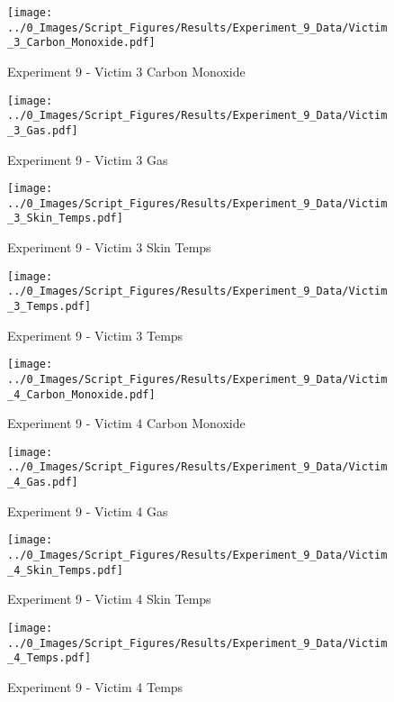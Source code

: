 	\clearpage

	\begin{figure}[H]
		\centering
		\texttt{[image: ../0\_Images/Script\_Figures/Results/Experiment\_9\_Data/Victim\_3\_Carbon\_Monoxide.pdf]}
		\caption[]{Experiment 9 - Victim 3 Carbon Monoxide}
	\end{figure}
 

	\begin{figure}[H]
		\centering
		\texttt{[image: ../0\_Images/Script\_Figures/Results/Experiment\_9\_Data/Victim\_3\_Gas.pdf]}
		\caption[]{Experiment 9 - Victim 3 Gas}
	\end{figure}
 
	\clearpage

	\begin{figure}[H]
		\centering
		\texttt{[image: ../0\_Images/Script\_Figures/Results/Experiment\_9\_Data/Victim\_3\_Skin\_Temps.pdf]}
		\caption[]{Experiment 9 - Victim 3 Skin Temps}
	\end{figure}
 

	\begin{figure}[H]
		\centering
		\texttt{[image: ../0\_Images/Script\_Figures/Results/Experiment\_9\_Data/Victim\_3\_Temps.pdf]}
		\caption[]{Experiment 9 - Victim 3 Temps}
	\end{figure}
 
	\clearpage

	\begin{figure}[H]
		\centering
		\texttt{[image: ../0\_Images/Script\_Figures/Results/Experiment\_9\_Data/Victim\_4\_Carbon\_Monoxide.pdf]}
		\caption[]{Experiment 9 - Victim 4 Carbon Monoxide}
	\end{figure}
 

	\begin{figure}[H]
		\centering
		\texttt{[image: ../0\_Images/Script\_Figures/Results/Experiment\_9\_Data/Victim\_4\_Gas.pdf]}
		\caption[]{Experiment 9 - Victim 4 Gas}
	\end{figure}
 
	\clearpage

	\begin{figure}[H]
		\centering
		\texttt{[image: ../0\_Images/Script\_Figures/Results/Experiment\_9\_Data/Victim\_4\_Skin\_Temps.pdf]}
		\caption[]{Experiment 9 - Victim 4 Skin Temps}
	\end{figure}
 

	\begin{figure}[H]
		\centering
		\texttt{[image: ../0\_Images/Script\_Figures/Results/Experiment\_9\_Data/Victim\_4\_Temps.pdf]}
		\caption[]{Experiment 9 - Victim 4 Temps}
	\end{figure}
 

